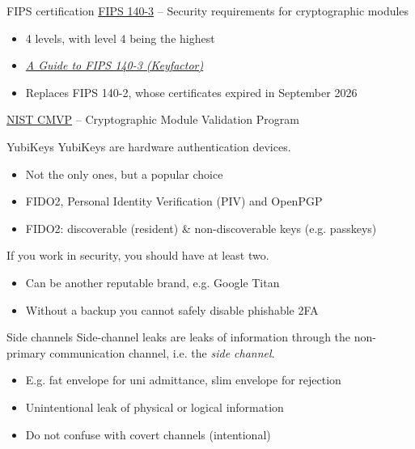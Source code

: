 \begin{frame}{FIPS certification}
  \href{https://csrc.nist.gov/pubs/fips/140-3/final}{FIPS 140-3} -- Security requirements for cryptographic modules
  \begin{itemize}
    \item 4 levels, with level 4 being the highest
    \item \href{https://www.keyfactor.com/blog/a-guide-to-fips-140-3/}{\textit{A Guide to FIPS 140-3 (Keyfactor)}}
    \item Replaces FIPS 140-2, whose certificates expired in September 2026
  \end{itemize}

  \vspace*{1em}

  \href{https://csrc.nist.gov/projects/cryptographic-module-validation-program}{NIST CMVP} -- Cryptographic Module Validation Program
\end{frame}

\begin{frame}{YubiKeys}
  YubiKeys are hardware authentication devices.
  \begin{itemize}[<+(1)->]
    \item Not the only ones, but a popular choice
    \item FIDO2, Personal Identity Verification (PIV) and OpenPGP
    \item FIDO2: discoverable (resident) \& non-discoverable keys (e.g. passkeys)
  \end{itemize}

  \vspace*{1em}

  \pause
  If you work in security, you should have at least two.
  \begin{itemize}[<+(1)->]
    \item Can be another reputable brand, e.g. Google Titan
    \item Without a backup you cannot safely disable phishable 2FA
  \end{itemize}
\end{frame}

\begin{frame}{Side channels}
  Side-channel leaks are leaks of information through the non-primary communication channel, i.e. the \emph{side channel}.
  \begin{itemize}[<+(1)->]
    \item E.g. fat envelope for uni admittance, slim envelope for rejection
    \item Unintentional leak of physical or logical information
    \item Do not confuse with covert channels (intentional)
  \end{itemize}
\end{frame}

